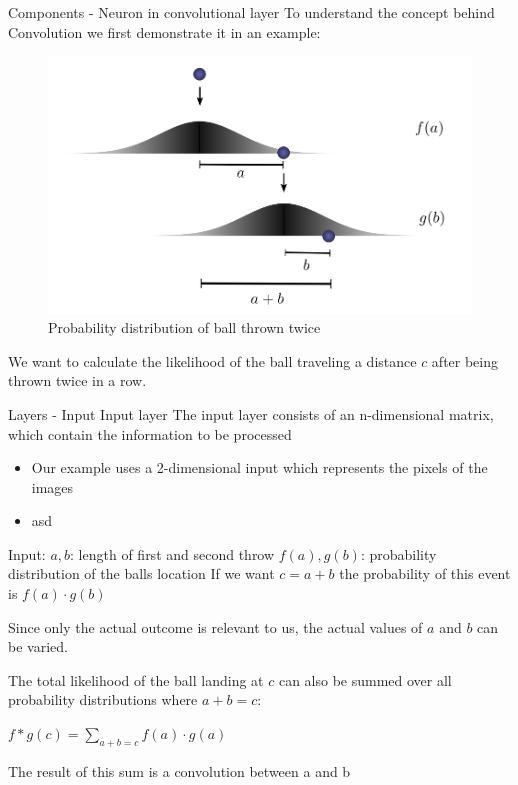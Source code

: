 \documentclass[12pt]{beamer}
\begin{document}
\begin{frame}{Components - Neuron in convolutional layer}
To understand the concept behind Convolution we first demonstrate it in an example:
\begin{figure}
\centering
\includegraphics[width = 0.4\linewidth]{images/convprob.png}
\caption{Probability distribution of ball thrown twice}
\label{fig:principle}
\end{figure}
We want to calculate the likelihood of the ball traveling a distance $c$ after being thrown twice in a row. \newline


\end{frame}
\begin{frame}{Layers - Input}
\huge
Input layer
\newline
\normalsize
The input layer consists of an n-dimensional matrix, which contain the information to be processed

\begin{itemize}
\item Our example uses a 2-dimensional input which represents the pixels of the images
\item asd
\end{itemize}



\end{frame}


\begin{frame}
Input: \newline
$a, b$: length of first and second throw
$f(a), g(b)$: probability distribution of the balls location
If we want $c = a + b$ the probability of this event is $f(a) \cdot g(b)$

Since only the actual outcome is relevant to us, the actual values of $a$ and $b$ can be varied.

The total likelihood of the ball landing at $c$ can also be summed over all probability distributions where $a+b=c$:

$f*g(c) = \sum_{a+b=c} {f(a) \cdot g(a)} $

The result of this sum is a convolution between a and b
\end{frame}
\end{document}
